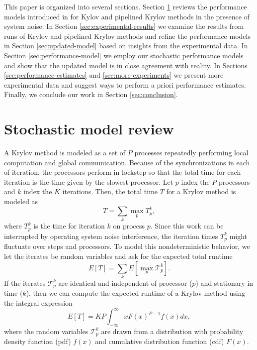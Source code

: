 \documentclass[sigconf]{acmart}
\begin{document}
This paper is organized into several sections. Section \ref{sec:model-review} reviews the performance models introduced in \cite{morgan2016krylov} for Kylov and pipelined Krylov methods in the presence of system noise. In Section \ref{sec:experimental-results} we examine the results from runs of Krylov and pipelined Krylov methods and refine the performance models in Section \ref{sec:updated-model} based on insights from the experimental data.
In Section \ref{sec:performance-model} we employ our stochastic performance models and show that the updated model is in close agreement with reality.  In Sections \ref{sec:performance-estimates} and \ref{sec:more-experiments} we present more experimental data and suggest ways to perform a priori performance estimates.  Finally, we conclude our work in Section \ref{sec:conclusion}. 

\section{Stochastic model review} \label{sec:model-review}

A Krylov method is modeled as a set of $P$ processes repeatedly performing local computation and global communication. Because of the synchronizations in each of iteration, the processors perform in lockstep so that the total time for each iteration is the time given by the slowest processor. Let $p$ index the $P$ processors and $k$ index the $K$ iterations. Then, the total time $T$ for a Krylov method is modeled as
\begin{equation}
T = \sum_k \max_p T^k_p,
\end{equation}
where $T^k_p$ is the time for iteration $k$ on process $p$. Since this work can be interrupted by operating system noise interference, the iteration times $T^k_p$ might fluctuate over steps and processors. To model this nondeterministic behavior, we let the iterates be random variables and ask for the expected total runtime
\begin{equation}
E[T] = \sum_k E[ \max_p \mathcal{T}^k_p]. \label{eq:krylov-expression}
\end{equation}
If the iterates $\mathcal{T}^k_p$ are identical and independent of processor ($p$) and stationary in time ($k$), then we can compute the expected runtime of a Krylov method using the integral expression 
\begin{equation}
E[T] =  K P \int ^{\infty}_{-\infty} x F(x)^{P-1} f(x) dx \label{eq:krylov-model},
\end{equation}
where the random variables $\mathcal{T}^k_p$ are drawn from a distribution with probability density function (pdf) $f(x)$ and cumulative distribution function (cdf) $F(x)$. 
\end{document}

